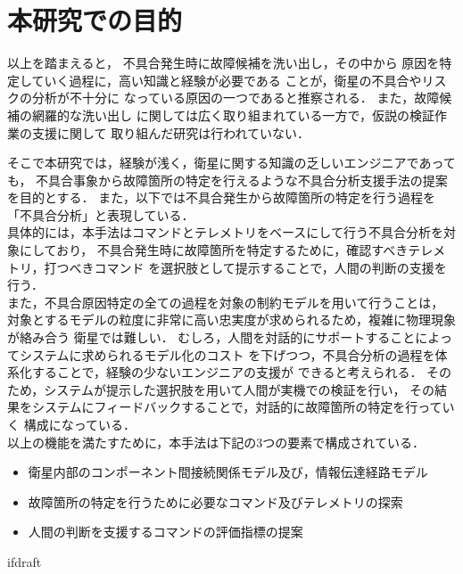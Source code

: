 \documentclass[11pt]{report}
\begin{document}
\section{本研究での目的}
以上を踏まえると，
不具合発生時に故障候補を洗い出し，その中から
原因を特定していく過程に，高い知識と経験が必要である
ことが，衛星の不具合やリスクの分析が不十分に
なっている原因の一つであると推察される．
また，故障候補の網羅的な洗い出し
に関しては広く取り組まれている一方で，仮説の検証作業の支援に関して
取り組んだ研究は行われていない．

そこで本研究では，経験が浅く，衛星に関する知識の乏しいエンジニアであっても，
不具合事象から故障箇所の特定を行えるような不具合分析支援手法の提案を目的とする．
また，以下では不具合発生から故障箇所の特定を行う過程を「不具合分析」と表現している．\\
具体的には，本手法はコマンドとテレメトリをベースにして行う不具合分析を対象にしており，
不具合発生時に故障箇所を特定するために，確認すべきテレメトリ，打つべきコマンド
を選択肢として提示することで，人間の判断の支援を行う．\\
また，不具合原因特定の全ての過程を対象の制約モデルを用いて行うことは，
対象とするモデルの粒度に非常に高い忠実度が求められるため，複雑に物理現象が絡み合う
衛星では難しい．
むしろ，人間を対話的にサポートすることによってシステムに求められるモデル化のコスト
を下げつつ，不具合分析の過程を体系化することで，経験の少ないエンジニアの支援が
できると考えられる．
そのため，システムが提示した選択肢を用いて人間が実機での検証を行い，
その結果をシステムにフィードバックすることで，対話的に故障箇所の特定を行っていく
構成になっている．\\
以上の機能を満たすために，本手法は下記の3つの要素で構成されている．
\begin{itemize}
   \item 衛星内部のコンポーネント間接続関係モデル及び，情報伝達経路モデル
   \item 故障箇所の特定を行うために必要なコマンド及びテレメトリの探索 %
   \item 人間の判断を支援するコマンドの評価指標の提案
\end{itemize}


\expandafter\ifx\csname ifdraft\endcsname\relax
\end{document}
